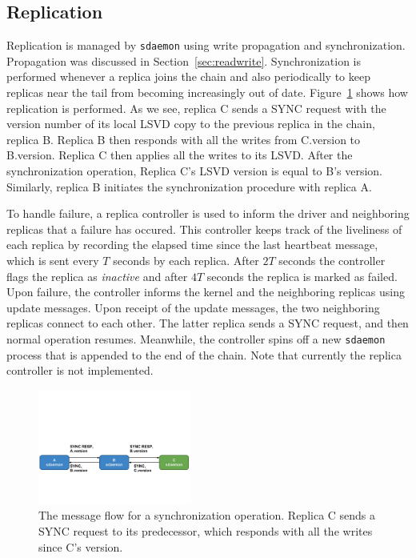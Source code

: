 \subsection{Replication}
\label{sec:replication}
Replication is managed by \texttt{sdaemon} using write propagation and 
synchronization. Propagation was discussed in Section~\ref{sec:readwrite}. 
Synchronization is performed whenever a replica joins the chain and also 
periodically to keep replicas near the tail from becoming increasingly out 
of date. Figure~\ref{fig:sync} shows how replication is performed. As we see,
replica C sends a SYNC request with the version number of its local LSVD 
copy to the previous replica in the chain, replica B. Replica B then responds
with all the writes from C.version to B.version. Replica C then applies all 
the writes to its LSVD. After the synchronization operation, Replica C's 
LSVD version is equal to B's version. Similarly, replica B initiates the 
synchronization procedure with replica A.

To handle failure, a replica controller is used to inform the driver and 
neighboring replicas that a failure has occured. This controller keeps track 
of the liveliness of each replica by recording the elapsed time since the 
last heartbeat message, which is sent every $T$ seconds by each replica. After
$2T$ seconds the controller flags the replica as \emph{inactive} and after 
$4T$ seconds the replica is marked as failed. Upon failure, the controller 
informs the kernel and the neighboring replicas using update messages. Upon
receipt of the update messages, the two neighboring replicas connect to each
other. The latter replica sends a SYNC request, and then normal operation 
resumes. Meanwhile, the controller spins off a new \texttt{sdaemon} process
that is appended to the end of the chain. Note that currently the replica 
controller is not implemented.

\begin{figure}[t]
    \includegraphics[width=0.45\textwidth, trim=0 2in 0 3in, clip]{./figures/sync.pdf}
    \caption{The message flow for a synchronization operation. Replica C 
            sends a SYNC request to its predecessor, which responds with all
            the writes since C's version.}
    \label{fig:sync}
\end{figure}

